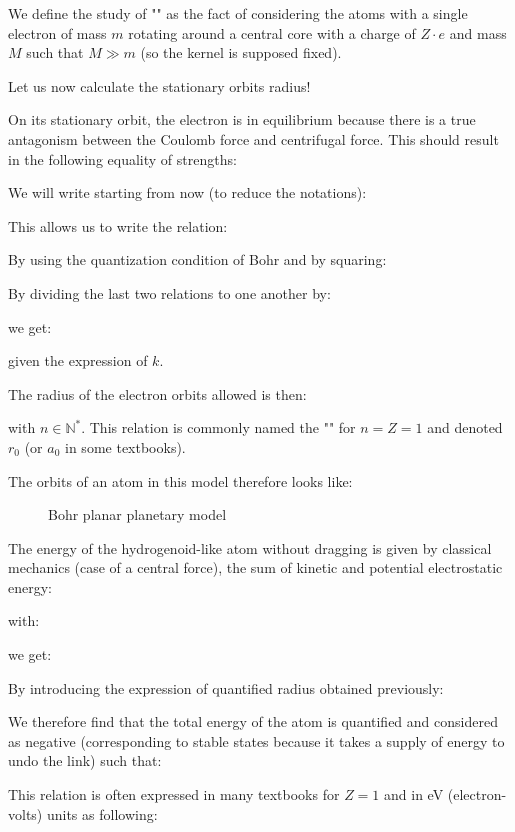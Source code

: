 	We define the study of "" as the fact of considering the atoms with a single electron of mass $m$ rotating around a central core with a charge of $Z \cdot e$ and mass $M$ such that $M \gg m$ (so the kernel is supposed fixed).
	
Let us now calculate the stationary orbits radius!

On its stationary orbit, the electron is in equilibrium because there is a true antagonism between the Coulomb force and centrifugal force. This should result in the following equality of strengths:
	
We will write starting from now (to reduce the notations):
	
This allows us to write the relation:
	
By using the quantization condition of Bohr and by squaring:
	
By dividing the last two relations to one another by:
	
we get:
		
given the expression of $k$.

The radius of the electron orbits allowed is then:
	
with $n \in \mathbb{N}^{*}$. This relation is commonly named the "\label{bohr radius}" for $n=Z=1$ and denoted $r_0$ (or $a_0$ in some textbooks).

The orbits of an atom in this model therefore looks like:

\begin{figure}[H]
\centering
{}
\caption{Bohr planar planetary model}
\end{figure}
The energy of the hydrogenoid-like atom without dragging is given by classical mechanics (case of a central force), the sum of kinetic and potential electrostatic energy:
	
with:
	
we get:
	
	By introducing the expression of quantified radius obtained previously:
	
We therefore find that the total energy of the atom is quantified and considered as negative (corresponding to stable states because it takes a supply of energy to undo the link) such that:
	
	\begin{tcolorbox}[title=Remark,colframe=black,arc=10pt]
	This relation is often expressed in many textbooks for $Z=1$ and in eV (electron-volts) units as following:
	
	\end{tcolorbox}	
	
